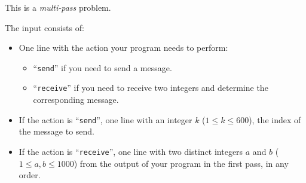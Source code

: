 
    This is a \emph{multi-pass} problem.

    The input consists of:
    \begin{itemize}
        \item One line with the action your program needs to perform:
            \begin{itemize}
                \item ``\texttt{send}'' if you need to send a message.
                \item ``\texttt{receive}'' if you need to receive two integers and determine the corresponding message.
            \end{itemize}
        \item If the action is ``\texttt{send}'', one line with an integer $k$ ($1 \leq k \leq 600$), the index of the message to send.
        \item If the action is ``\texttt{receive}'', one line with two distinct integers $a$ and $b$ ($1 \leq a, b \leq 1000$)
            from the output of your program in the first pass, in any order.
    \end{itemize}
